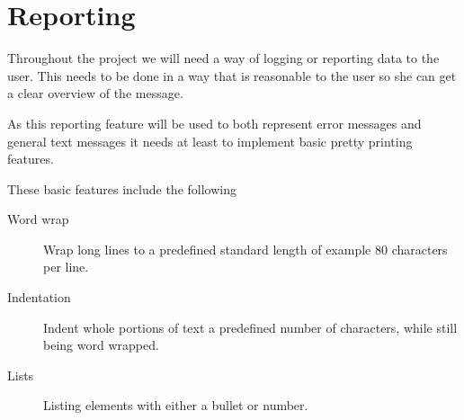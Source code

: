 \section{Reporting}

Throughout the project we will need a way of logging or reporting data to the
user. This needs to be done in a way that is reasonable to the user so she can
get a clear overview of the message.

As this reporting feature will be used to both represent error messages and
general text messages it needs at least to implement basic pretty printing
features.

These basic features include the following

\begin{description}
\item[Word wrap] Wrap long lines to a predefined standard length of example 80
  characters per line.

\item[Indentation] Indent whole portions of text a predefined number of
  characters, while still being word wrapped.

\item[Lists] Listing elements with either a bullet or number.
\end{description}



